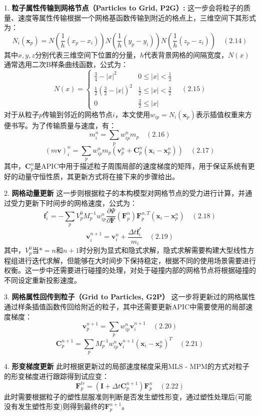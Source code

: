 1. \textbf{粒子属性传输到网格节点（Particles to Grid, P2G）:}
这一步会将粒子的质量、速度等属性传输根据一个网格基函数传输到附近的格点上，三维空间下其形式为：
\[
N_i(\mathbf{x}_p) = N\left(\frac{1}{h}(x_p - x_i)\right)N\left(\frac{1}{h}(y_p - y_i)\right)N\left(\frac{1}{h}(z_p - z_i)\right) \quad (2.14)
\]
其中\(x,y,z\)分别代表三维空间下位置的分量，\(h\)代表背景网格的间隔宽度，\(N(x)\)通常选用二次B样条曲线函数，公式为：
\[
N(x)=
\begin{cases}
\frac{3}{4} - |x|^2 & 0 \leq |x| < \frac{1}{2} \\
\frac{1}{2}(\frac{3}{2} - |x|)^2 & \frac{1}{2} \leq |x| < \frac{3}{2} \\
0 & \frac{3}{2} \leq |x|
\end{cases} \quad (2.15)
\]
对于从粒子\(p\)传输到邻近的网格节点\(i\)，本文使用\(w_{ip} = N_i(\mathbf{x}_p)\)表示插值权重来方便书写。为了传输质量与速度，有：
\[
m_i^n = \sum_p w_{ip}^n m_p \quad (2.16)
\]
\[
(m\mathbf{v})_i^n = \sum_p w_{ip}^n m_p (\mathbf{v}_p^n + \mathbf{C}_p^n (\mathbf{x}_i - \mathbf{x}_p^n)) \quad (2.17)
\]
其中，\(\mathbf{C}_p^n\)是APIC中用于描述粒子周围局部的速度梯度的矩阵，用于保证系统有更好的动量守恒性质，其更新方式将在接下来的步骤给出。

2. \textbf{网格动量更新}
这一步则根据粒子的本构模型对网格节点的受力进行计算，并通过受力更新下时间步的网格速度，公式为：
\[
\mathbf{f}_i^* = - \sum_p V_p^0 M_p^{-1} w_{ip}^n \frac{\partial \Psi}{\partial \mathbf{F}} (\mathbf{F}_p^n) \mathbf{F}_p^{n,T} (\mathbf{x}_i - \mathbf{x}_p^n) \quad (2.18)
\]
\[
\mathbf{v}_i^{n + 1} = \mathbf{v}_i^n + \frac{\Delta t \mathbf{f}_i^*}{m_i} \quad (2.19)
\]
其中，\(V_p^0\)当\(* = n\)和\(n + 1\)时分别为显式和隐式求解，隐式求解需要构建大型线性方程组进行迭代求解，但能够在大时间步下保持稳定，根据不同的使用场景需要进行权衡。这一步中还需要进行碰撞的处理，对处于碰撞内部的网格节点将根据碰撞的不同设定重新投影速度。

3. \textbf{网格属性回传到粒子（Grid to Particles, G2P）}
这一步将更新过的网格属性通过样条插值函数传回给附近的粒子，其中还需要更新APIC中需要使用的局部速度梯度：
\[
\mathbf{v}_p^{n + 1} = \sum_p w_{ip}^n \mathbf{v}_i^{n + 1} \quad (2.20)
\]
\[
\mathbf{C}_p^{n + 1} = \sum_p M_p^{-1} w_{ip}^n \mathbf{v}_i^{n + 1} (\mathbf{x}_i - \mathbf{x}_p^n)^T \quad (2.21)
\]

4. \textbf{形变梯度更新}
此时根据更新过的局部速度梯度采用MLS - MPM的方式对粒子的形变梯度进行跟踪得到试应变：
\[
\mathbf{F}_p^{tr} = (\mathbf{I} + \Delta t \mathbf{C}_p^{n + 1}) \mathbf{F}_p^n \quad (2.22)
\]
此时需要根据粒子的塑性屈服准则判断是否发生塑性形变，通过塑性处理后(可能没有发生塑性形变)则得到最终的\(\mathbf{F}_p^{n + 1}\)。

